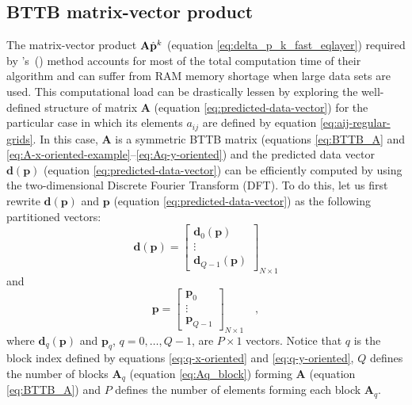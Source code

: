\documentclass[manuscript,revised]{geophysics}
\begin{document}
\subsection{BTTB matrix-vector product}

The matrix-vector product $\tensor{A} \hat{\mathbf{p}}^{k}$ (equation \ref{eq:delta_p_k_fast_eqlayer}) 
required by \citeauthor{siqueira-etal2017}'s~(\citeyear{siqueira-etal2017}) method
accounts for most of the total computation time of their algorithm and can suffer
from RAM memory shortage when large data sets are used.
This computational load can be drastically lessen by exploring the well-defined structure of 
matrix $\mathbf{A}$ (equation \ref{eq:predicted-data-vector}) for the particular case in which 
its elements $a_{ij}$ are defined by equation \ref{eq:aij-regular-grids}. 
In this case, $\mathbf{A}$ is a symmetric BTTB matrix (equations \ref{eq:BTTB_A} and 
\ref{eq:A-x-oriented-example}--\ref{eq:Aq-y-oriented}) and the predicted data vector 
$\mathbf{d}(\mathbf{p})$ (equation \ref{eq:predicted-data-vector}) can be efficiently
computed by using the two-dimensional Discrete Fourier Transform (DFT).
To do this, let us first rewrite $\mathbf{d}(\mathbf{p})$ and
$\mathbf{p}$ (equation \ref{eq:predicted-data-vector}) as the following partitioned vectors:
\begin{equation}
\mathbf{d}(\mathbf{p}) = \begin{bmatrix}
\mathbf{d}_{0}(\mathbf{p}) \\
\vdots \\
\mathbf{d}_{Q - 1}(\mathbf{p})
\end{bmatrix}_{N \times 1}
\label{eq:predicted-data-vector-partitioned}
\end{equation}
and
\begin{equation}
\mathbf{p} = \begin{bmatrix}
\mathbf{p}_{0} \\
\vdots \\
\mathbf{p}_{Q - 1}
\end{bmatrix}_{N \times 1} \quad ,
\label{eq:parameter-vector-partitioned}
\end{equation}
where $\mathbf{d}_{q}(\mathbf{p})$ and $\mathbf{p}_{q}$, $q = 0, \dots, Q - 1$,
are $P \times 1$ vectors. Notice that $q$ is the block index defined by equations 
\ref{eq:q-x-oriented} and \ref{eq:q-y-oriented}, $Q$ defines the number of blocks
$\mathbf{A}_{q}$ (equation \ref{eq:Aq_block}) forming $\mathbf{A}$ (equation \ref{eq:BTTB_A}) 
and $P$ defines the number of elements forming each block $\mathbf{A}_{q}$.
\end{document}
